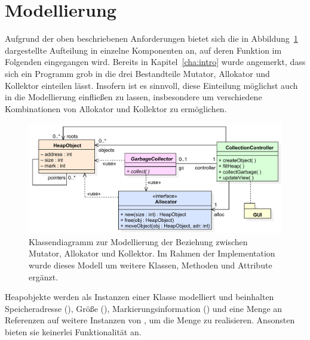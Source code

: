 \section{Modellierung}
\label{sec:model}
Aufgrund der oben beschriebenen Anforderungen bietet sich die in Abbildung~\ref{fig:model} dargestellte Aufteilung in einzelne Komponenten an, auf deren Funktion im Folgenden eingegangen wird.
Bereits in Kapitel~\ref{cha:intro} wurde angemerkt, dass sich ein Programm grob in die drei Bestandteile Mutator, Allokator und Kollektor einteilen lässt.
Insofern ist es sinnvoll, diese Einteilung möglichst auch in die Modellierung einfließen zu lassen, insbesondere um verschiedene Kombinationen von Allokator und Kollektor zu ermöglichen.

\begin{figure}[h]
	\centering
	\includegraphics[scale=0.6]{img/uml/ch7-model.pdf}
	\caption[Klassendiagramm zur Modellierung von Mutator, Allokator, Kollektor]{Klassendiagramm zur Modellierung der Beziehung zwischen Mutator, Allokator und Kollektor. Im Rahmen der Implementation wurde dieses Modell um weitere Klassen, Methoden und Attribute ergänzt.}
	\label{fig:model}
\end{figure}

Heapobjekte werden als Instanzen einer Klasse  modelliert und beinhalten Speicheradresse (), Größe (), Markierungsinformation () und eine Menge  an Referenzen auf weitere Instanzen von , um die Menge \Pointers zu realisieren.
Ansonsten bieten sie keinerlei Funktionalität an.

